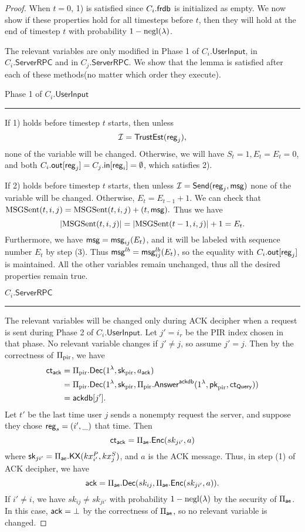 \begin{proof}
When $t = 0$, 1) is satisfied since $C_i.\mathsf{frdb}$ is initialized as empty. We now show if these properties hold for all timesteps before $t$, then they will hold at the end of timestep $t$ with probability $1 - \operatorname{negl}(\lambda)$.

The relevant variables are only modified in Phase 1 of $C_i.\mathsf{UserInput}$, in $C_i.\mathsf{ServerRPC}$ and in $C_j.\mathsf{ServerRPC}$. We show that the lemma is satisfied after each of these methods(no matter which order they execute).

Phase 1 of $C_i.\mathsf{UserInput}$
\hrule
If 1) holds before timestep $t$ starts, then unless 
$$\mathcal{I} = \mathsf{TrustEst}(\mathsf{reg}_j),$$
none of the variable will be changed. Otherwise, we will have $S_t = 1, E_t = E_t = 0$, and both $C_i.\mathsf{out}[\mathsf{reg}_j] = C_j.\mathsf{in}[\mathsf{reg}_i] = \emptyset$, which satisfies 2).

If 2) holds before timestep $t$ starts, then unless $\mathcal{I} = \mathsf{Send}(\mathsf{reg}_j, \mathsf{msg})$ none of the variable will be changed. Otherwise, $E_t = E_{t - 1} + 1$. We can check that
$\text{MSGSent}(t, i, j) = \text{MSGSent}(t, i, j) + (t, \mathsf{msg}).$
Thus we have
$$\left| \text{MSGSent}(t, i, j) \right| = \left| \text{MSGSent}(t - 1, i, j) \right| + 1 = E_t.$$
Furthermore, we have $\mathsf{msg} = \mathsf{msg}_{ij}(E_t)$, and it will be labeled with sequence number $E_t$ by step (3). Thus $\mathsf{msg}^{lb} = \mathsf{msg}^{lb}_{ij}(E_t)$, so the equality with $C_i.\mathsf{out}[\mathsf{reg}_j]$ is maintained. All the other variables remain unchanged, thus all the desired properties remain true.

\vspace{10pt}
$C_i.\mathsf{ServerRPC}$
\hrule
The relevant variables will be changed only during ACK decipher when a request is sent during Phase 2 of $C_i.\mathsf{UserInput}$. Let $j' = i_r$ be the PIR index chosen in that phase. No relevant variable changes if $j' \neq j$, so assume $j' = j$. Then by the correctness of $\Pi_{\text{pir}}$, we have
\begin{align*}
 \mathsf{ct}_{\mathsf{ack}} &= \Pi_{\text{pir}}.\mathsf{Dec}(1^{\lambda}, {\mathsf{sk}}_{\text{pir}}, a_{\mathsf{ack}})   \\
 &= \Pi_{\text{pir}}.\mathsf{Dec}(1^{\lambda}, {\mathsf{sk}}_{\text{pir}}, \Pi_{\text{pir}}.\mathsf{Answer}^{\mathsf{ackdb}}(1^{\lambda}, \mathsf{pk}_{\text{pir}}, \mathsf{ct}_{\mathsf{Query}})) \\
 &= \mathsf{ackdb}[j'].
\end{align*}
Let $t'$ be the last time user $j$ sends a nonempty request the server, and suppose they chose $\mathsf{reg}_s = (i', \_)$ that time. Then
$$\mathsf{ct}_{\mathsf{ack}} = \Pi_{\mathsf{ae}}.\mathsf{Enc}(sk_{ji'}, a)$$
where ${\mathsf{sk}}_{ji'} = \Pi_{\mathsf{ae}}.\mathsf{KX}(kx_{i'}^P, kx_{j}^S)$, and $a$ is the ACK message. Thus, in step (1) of ACK decipher, we have
$$\mathsf{ack} = \Pi_{\mathsf{ae}}.\mathsf{Dec}(sk_{ij}, \Pi_{\mathsf{ae}}.\mathsf{Enc}(sk_{ji'}, a)).$$
If $i' \neq i$, we have $sk_{ij} \neq sk_{ji'}$ with probability $1 - \operatorname{negl}(\lambda)$ by the security of $\Pi_{\mathsf{ae}}$. In this case, $\mathsf{ack} = \bot$ by the correctness of $\Pi_{\mathsf{ae}}$, so no relevant variable is changed. 


\end{proof}
